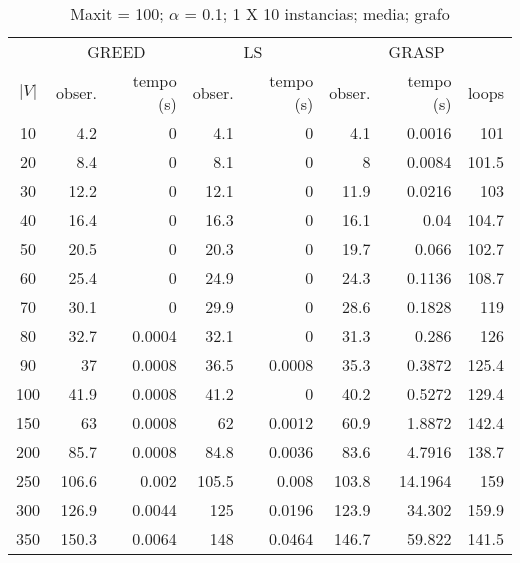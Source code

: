 \documentclass[]{article}
\begin{document}
\begin {table}[h]
\centering
\caption{Maxit = 100; $\alpha$ = 0.1; 1 X 10 instancias; media; grafo}
\begin{small}
	\begin{tabular}{|c|r|r|r|r|r|r|r|}
		\hline
		& \multicolumn{2}{c|}{GREED} & \multicolumn{2}{c|}{LS} & \multicolumn{3}{c|}{GRASP} \\ 
		\cline{2-8}
		$|V|$   &  obser. & tempo (s)  & obser. & tempo (s) & obser. & tempo (s) & loops\\ 
		\hline
		10 & 4.2 & 0 & 4.1 & 0 & 4.1 & 0.0016 & 101 \\ 
		20 & 8.4 & 0 & 8.1 & 0 & 8 & 0.0084 & 101.5 \\ 
		30 & 12.2 & 0 & 12.1 & 0 & 11.9 & 0.0216 & 103 \\ 
		40 & 16.4 & 0 & 16.3 & 0 & 16.1 & 0.04 & 104.7 \\ 
		50 & 20.5 & 0 & 20.3 & 0 & 19.7 & 0.066 & 102.7 \\ 
		60 & 25.4 & 0 & 24.9 & 0 & 24.3 & 0.1136 & 108.7 \\ 
		70 & 30.1 & 0 & 29.9 & 0 & 28.6 & 0.1828 & 119 \\ 
		80 & 32.7 & 0.0004 & 32.1 & 0 & 31.3 & 0.286 & 126 \\ 
		90 & 37 & 0.0008 & 36.5 & 0.0008 & 35.3 & 0.3872 & 125.4 \\ 
		100 & 41.9 & 0.0008 & 41.2 & 0 & 40.2 & 0.5272 & 129.4 \\ 
		150 & 63 & 0.0008 & 62 & 0.0012 & 60.9 & 1.8872 & 142.4 \\ 
		200 & 85.7 & 0.0008 & 84.8 & 0.0036 & 83.6 & 4.7916 & 138.7 \\ 
		250 & 106.6 & 0.002 & 105.5 & 0.008 & 103.8 & 14.1964 & 159 \\ 
		300 & 126.9 & 0.0044 & 125 & 0.0196 & 123.9 & 34.302 & 159.9 \\ 
		350 & 150.3 & 0.0064 & 148 & 0.0464 & 146.7 & 59.822 & 141.5 \\ 
		\hline
	\end{tabular} \label{}
\end{small}
\end{table}
\end{document}
